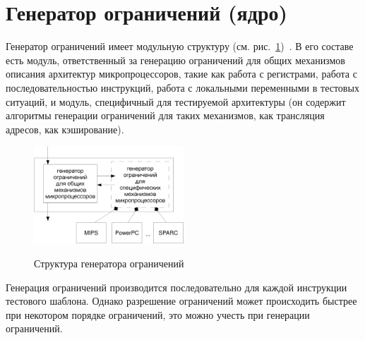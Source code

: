 \section{Генератор ограничений (ядро)}

Генератор ограничений имеет модульную структуру (см.
рис.~\ref{generator})~\cite{my_lomonosov_2009, my_miet_2009}. В его
составе есть модуль, ответственный за генерацию ограничений для
общих механизмов описания архитектур микропроцессоров, такие как
работа с регистрами, работа с последовательностью инструкций, работа
с локальными переменными в тестовых ситуаций, и модуль, специфичный
для тестируемой архитектуры (он содержит алгоритмы генерации
ограничений для таких механизмов, как трансляция адресов, как
кэширование).

\begin{figure}[h] \center
  \includegraphics[width=0.5\textwidth]{3.impl/generator}\\
  \caption{Структура генератора ограничений}\label{generator}
\end{figure}

Генерация ограничений производится последовательно для каждой
инструкции тестового шаблона. Однако разрешение ограничений может
происходить быстрее при некотором порядке ограничений, это можно
учесть при генерации ограничений.

